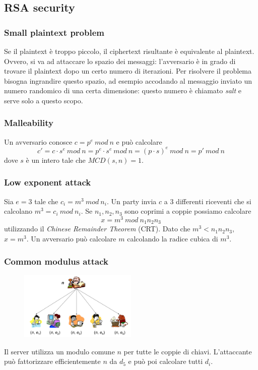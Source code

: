 \documentclass[a4paper,12pt]{article}
\begin{document}
\subsection{RSA security}
\subsubsection{Small plaintext problem}
Se il plaintext è troppo piccolo, il ciphertext risultante è equivalente al plaintext. \\
Ovvero, si va ad attaccare lo spazio dei messaggi: l'avversario è in grado di trovare il plaintext dopo un certo numero di iterazioni. 
Per risolvere il problema bisogna ingrandire questo spazio, ad esempio accodando al messaggio inviato un numero randomico di una certa dimensione: questo numero è chiamato \textit{salt} e serve solo a questo scopo.

\subsubsection{Malleability}
Un avversario conosce $c = p^e\ mod\ n$ e può calcolare
$$ c' = c \cdot s^e\ mod\ n = p^e \cdot s^e\ mod\ n = (p \cdot s)^e\ mod\ n = p'\ mod\ n $$
dove $s$ è un intero tale che $MCD(s, n) = 1$.

\subsubsection{Low exponent attack}
Sia $e = 3$ tale che $c_i = m^3\ mod\ n_i$.
Un party invia $c$ a 3 differenti riceventi che si calcolano $m^3 = c_i\ mod\ n_i$.
Se $n_1, n_2, n_3$ sono coprimi a coppie possiamo calcolare
$$ x = m^3\ mod\ n_1n_2n_3$$ 
utilizzando il \textit{Chinese Remainder Theorem} (CRT).
Dato che $m^3 < n_1n_2n_3$, $x = m^3$. Un avversario può calcolare $m$ calcolando la radice cubica di $m^3$.

\subsubsection{Common modulus attack}

\begin{figure}[H]
  \centering
  \includegraphics[width=0.5\textwidth]{img/common-modulus-attack}
\end{figure}
Il server utilizza un modulo comune $n$ per tutte le coppie di chiavi.
L'attaccante può fattorizzare efficientemente $n$ da $d_5$ e può poi calcolare tutti $d_i$.
\end{document}
